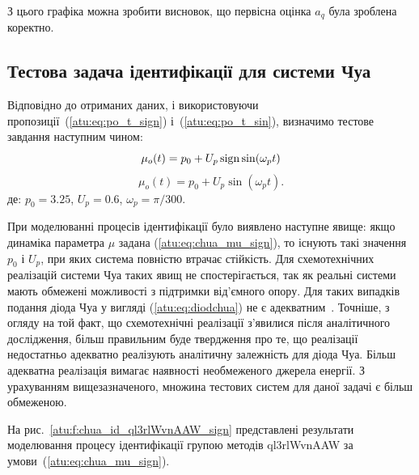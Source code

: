 З цього графіка можна зробити висновок, що первісна оцінка $ a_q $ була зроблена коректно.


\subsection{Тестова задача ідентифікації для системи Чуа}%

Відповідно до отриманих даних, і використовуючи
пропозиції~(\ref{atu:eq:po_t_sign}) і~(\ref{atu:eq:po_t_sin}), визначимо тестове
завдання наступним чином:
%
\begin{equation}
 \mu_o(t) = p_0 + U_p \operatorname*{sign} \sin( \omega_p t )
  \label{atu:eq:chua_mu_sign}
\end{equation}
%
\begin{equation}
 \mu_o(t) = p_0 + U_p \sin( \omega_p t ).
  \label{atu:eq:chua_mu_sin}
\end{equation}
%
де:
$p_0 = 3.25$, $U_p=0.6$, $\omega_p = \pi / 300$.

При моделюванні процесів ідентифікації було виявлено наступне
явище: якщо динаміка параметра
$ \mu $ задана (\ref{atu:eq:chua_mu_sign}), то існують такі значення
$ p_0 $ і $ U_p $, при яких система повністю втрачає стійкість. Для
схемотехнічних реалізацій системи Чуа таких явищ не
спостерігається, так як реальні системи мають обмежені
можливості з підтримки від'ємного опору. Для таких
випадків подання діода Чуа у вигляді (\ref{atu:eq:diodchua}) не є
адекватним~\cite{atu_kher2014}. Точніше, з огляду на той факт, що
схемотехнічні реалізації з'явилися після аналітичного
дослідження, більш правильним буде твердження про те, що реалізації
недостатньо адекватно реалізують аналітичну залежність
для діода Чуа. Більш адекватна реалізація вимагає наявності
необмеженого джерела енергії. З урахуванням вищезазначеного,
множина тестових систем для даної задачі є більш обмеженою.

На рис.~\ref{atu:f:chua_id_ql3rlWvnAAW_sign} представлені результати
моделювання процесу ідентифікації групою методів ql3rlWvnAAW за
умови~(\ref{atu:eq:chua_mu_sign}).


